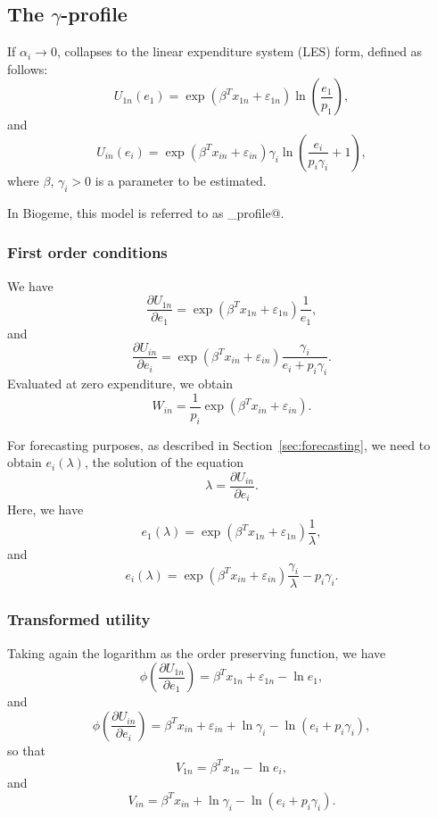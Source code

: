 \documentclass[12pt,a4paper]{article}
\begin{document}
\subsection{The $\gamma$-profile}
If $\alpha_i \to 0$,  collapses to the linear expenditure system (LES) form, defined as follows:
\begin{equation}
  \label{eq:u_les_outside}
U_{1n}(e_{1})= \exp(\beta^T x_{1n} + \varepsilon_{1n}) \ln \left(\frac{e_1}{p_1} \right),
\end{equation}
and
\begin{equation}
  \label{eq:u_les}
U_{in}(e_{i})= \exp(\beta^T x_{in} + \varepsilon_{in}) \gamma_i \ln \left(\frac{e_i}{p_i \gamma_i}+1 \right),
\end{equation}
where $\beta$, $\gamma_i > 0$ is a  parameter to be
estimated.

In Biogeme, this model is referred to as \lstinline@gamma_profile@.
\subsubsection*{First order conditions}
We have
\[
\frac{\partial U_{1n}}{\partial e_1} =  \exp(\beta^T x_{1n} + \varepsilon_{1n}) \frac{1}{e_1},
\]
and
\[
\frac{\partial U_{in}}{\partial e_i} =  \exp(\beta^T x_{in} + \varepsilon_{in}) \frac{\gamma_i}{e_i + p_i \gamma_i}.
\]
Evaluated at zero expenditure, we obtain
\[
    W_{in} =  \frac{1}{p_i}\exp(\beta^T x_{in} + \varepsilon_{in}).
\]

For forecasting purposes, as described in Section~\ref{sec:forecasting}, we need to obtain $e_i(\lambda)$, the solution of the equation
\[\lambda = \frac{\partial U_{in}}{\partial e_i}. \]
Here, we have
\begin{equation}
    \label{eq:gamma_optimal_outside}
   e_1(\lambda) = \exp(\beta^T x_{1n} + \varepsilon_{1n}) \frac{1}{\lambda},
\end{equation}
and
\begin{equation}
    \label{eq:gamma_optimal}
  e_i(\lambda) = \exp(\beta^T x_{in} + \varepsilon_{in}) \frac{\gamma_i}{\lambda } -p_i \gamma_i.
 \end{equation}

\subsubsection*{Transformed utility}
Taking again the logarithm as the order preserving function, we have
\[
\phi\left(\frac{\partial U_{1n}}{\partial e_1}\right) =\beta^T x_{1n} + \varepsilon_{1n} - \ln e_1,
\]
and
\[
\phi\left(\frac{\partial U_{in}}{\partial e_i}\right) =\beta^T x_{in} + \varepsilon_{in} + \ln \gamma_i - \ln(e_i + p_i \gamma_i),
\]
so that
\[
V_{1n} = \beta^T x_{1n}  - \ln e_i,
\]
and
\[
V_{in} = \beta^T x_{in} + \ln \gamma_i - \ln(e_i + p_i \gamma_i).
\]
\end{document}

